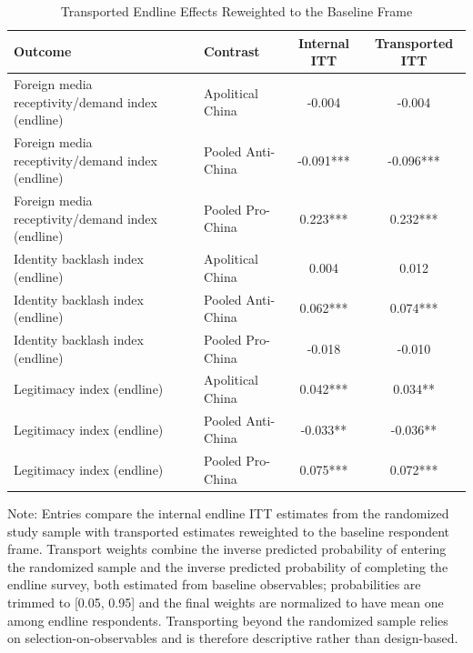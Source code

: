 \begin{table}[H]
\centering
\caption{Transported Endline Effects Reweighted to the Baseline Frame}
\label{tab:transported_effects_t1}
\footnotesize
\begin{threeparttable}
\begin{tabular}{llcc}
\toprule
Outcome & Contrast & Internal ITT & Transported ITT \\
\midrule
Foreign media receptivity/demand index (endline) & Apolitical China & -0.004 & -0.004 \\
Foreign media receptivity/demand index (endline) & Pooled Anti-China & -0.091*** & -0.096*** \\
Foreign media receptivity/demand index (endline) & Pooled Pro-China & 0.223*** & 0.232*** \\
Identity backlash index (endline) & Apolitical China & 0.004 & 0.012 \\
Identity backlash index (endline) & Pooled Anti-China & 0.062*** & 0.074*** \\
Identity backlash index (endline) & Pooled Pro-China & -0.018 & -0.010 \\
Legitimacy index (endline) & Apolitical China & 0.042*** & 0.034** \\
Legitimacy index (endline) & Pooled Anti-China & -0.033** & -0.036** \\
Legitimacy index (endline) & Pooled Pro-China & 0.075*** & 0.072*** \\
\bottomrule
\end{tabular}
\begin{tablenotes}[flushleft]
\footnotesize
\item Note: Entries compare the internal endline ITT estimates from the randomized study sample with transported estimates reweighted to the baseline respondent frame. Transport weights combine the inverse predicted probability of entering the randomized sample and the inverse predicted probability of completing the endline survey, both estimated from baseline observables; probabilities are trimmed to [0.05, 0.95] and the final weights are normalized to have mean one among endline respondents. Transporting beyond the randomized sample relies on selection-on-observables and is therefore descriptive rather than design-based.
\end{tablenotes}
\end{threeparttable}
\end{table}
